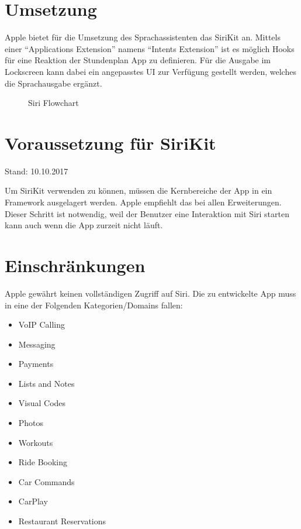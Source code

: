 \section{Umsetzung}
Apple bietet für die Umsetzung des Sprachassistenten das SiriKit an. Mittels einer “Applications Extension” namens “Intents Extension” ist es möglich Hooks für eine Reaktion der Stundenplan App zu definieren. Für die Ausgabe im Lockscreen kann dabei ein angepasstes UI zur Verfügung gestellt werden, welches die Sprachausgabe ergänzt.
\newline


\begin{figure}[ht]
	\centering
	\caption{Siri Flowchart}
	\label{fig1}
\end{figure}


\section{Voraussetzung für SiriKit}

Stand: 10.10.2017

Um SiriKit verwenden zu können, müssen die Kernbereiche der App in ein Framework ausgelagert werden. 
Apple empfiehlt das bei allen Erweiterungen.  Dieser Schritt ist notwendig, weil der Benutzer eine Interaktion mit Siri starten kann auch wenn die App zurzeit nicht läuft.  



\section{Einschränkungen}

Apple gewährt keinen vollständigen Zugriff auf Siri. Die zu entwickelte App muss in eine der Folgenden Kategorien/Domains fallen:
\begin{itemize}
\item VoIP Calling 
\item Messaging
\item Payments
\item Lists and Notes
\item Visual Codes
\item Photos
\item Workouts
\item Ride Booking
\item Car Commands
\item CarPlay
\item Restaurant Reservations
\end{itemize}

